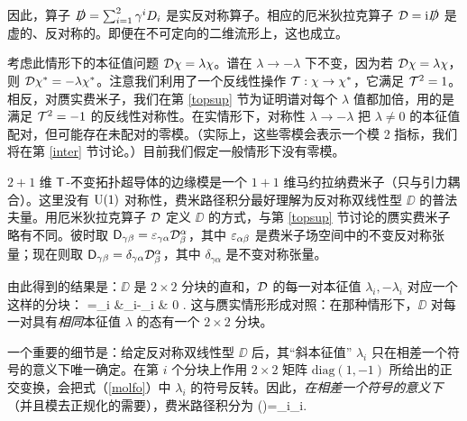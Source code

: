 因此，算子 $\slashed{D}=\sum_{i=1}^2 \gamma^i D_i$ 是实反对称算子。相应的厄米狄拉克算子 ${\mathcal D}={\mathrm i}\slashed{D}$ 是虚的、反对称的。即便在不可定向的二维流形上，这也成立。

考虑此情形下的本征值问题 ${\mathcal D}\chi=\lambda\chi$。谱在 $\lambda\to -\lambda$ 下不变，因为若 ${\mathcal D}\chi=\lambda\chi$，则 ${\mathcal D}\chi^*=-\lambda\chi^*$。注意我们利用了一个反线性操作 ${\mathcal T}:\chi\to\chi^*$，它满足 ${\mathcal T}^2=1$。相反，对赝实费米子，我们在第 \ref{topsup} 节为证明谱对每个 $\lambda$ 值都加倍，用的是满足 ${\mathcal T}^2=-1$ 的反线性对称性。在实情形下，对称性 $\lambda\to-\lambda$ 把 $\lambda\not=0$ 的本征值配对，但可能存在未配对的零模。（实际上，这些零模会表示一个模 2 指标，我们将在第 \ref{inter} 节讨论。）目前我们假定一般情形下没有零模。


$2+1$ 维 ${\sf T}$-不变拓扑超导体的边缘模是一个 $1+1$ 维马约拉纳费米子（只与引力耦合）。这里没有 ${\mathrm U}(1)$ 对称性，费米路径积分最好理解为反对称双线性型 $\DD$ 的普法夫量。用厄米狄拉克算子 ${\mathcal D}$ 定义 $\DD$ 的方式，与第 \ref{topsup} 节讨论的赝实费米子略有不同。彼时取 ${\sf D}_{\gamma\beta}=\varepsilon_{\gamma\alpha}{\mathcal D}^\alpha_\beta$，其中 $\varepsilon_{\alpha\beta}$ 是费米子场空间中的不变反对称张量；现在则取 ${\sf D}_{\gamma\beta}=\delta_{\gamma\alpha}{\mathcal D}^\alpha_\beta$，其中 $\delta_{\gamma\alpha}$ 是不变对称张量。

由此得到的结果是：$\DD$ 是 $2\times 2$ 分块的直和，${\mathcal D}$ 的每一对本征值 $\lambda_i,-\lambda_i$ 对应一个这样的分块：
\be\label{molfo}\DD=\bigoplus_i &\lambda_i\cr -\lambda_i & 0 \ep. \ee
这与赝实情形形成对照：在那种情形下，$\DD$ 对每一对具有{\it 相同}本征值 $\lambda$ 的态有一个 $2\times 2$ 分块。


一个重要的细节是：给定反对称双线性型 $\DD$ 后，其“斜本征值” $\lambda_i$ 只在相差一个符号的意义下唯一确定。在第 $i$ 个分块上作用 $2\times 2$ 矩阵 $\mathrm{diag}(1,-1)$ 所给出的正交变换，会把式（\ref{molfo}）中 $\lambda_i$ 的符号反转。因此，{\it 在相差一个符号的意义下}（并且模去正规化的需要），费米路径积分为
\be\label{wolfo}\Pf(\DD)=\prod_i\lambda_i.\ee

